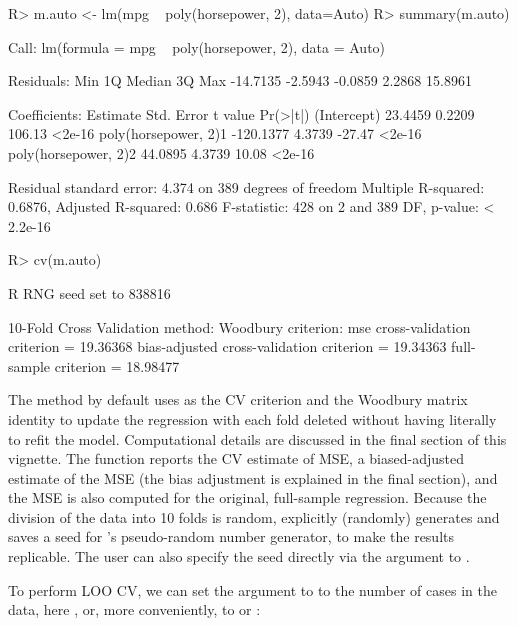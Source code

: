 \documentclass[
]{jss}
\begin{document}
\begin{CodeChunk}
\begin{CodeInput}
R> m.auto <- lm(mpg ~ poly(horsepower, 2), data=Auto)
R> summary(m.auto)
\end{CodeInput}
\begin{CodeOutput}

Call:
lm(formula = mpg ~ poly(horsepower, 2), data = Auto)

Residuals:
     Min       1Q   Median       3Q      Max 
-14.7135  -2.5943  -0.0859   2.2868  15.8961 

Coefficients:
                      Estimate Std. Error t value Pr(>|t|)
(Intercept)            23.4459     0.2209  106.13   <2e-16
poly(horsepower, 2)1 -120.1377     4.3739  -27.47   <2e-16
poly(horsepower, 2)2   44.0895     4.3739   10.08   <2e-16

Residual standard error: 4.374 on 389 degrees of freedom
Multiple R-squared:  0.6876,    Adjusted R-squared:  0.686 
F-statistic:   428 on 2 and 389 DF,  p-value: < 2.2e-16
\end{CodeOutput}
\begin{CodeInput}
R> cv(m.auto)
\end{CodeInput}
\begin{CodeOutput}
R RNG seed set to 838816
\end{CodeOutput}
\begin{CodeOutput}
10-Fold Cross Validation
method: Woodbury
criterion: mse
cross-validation criterion = 19.36368
bias-adjusted cross-validation criterion = 19.34363
full-sample criterion = 18.98477 
\end{CodeOutput}
\end{CodeChunk}

The  method by default uses  as the CV criterion
and the Woodbury matrix identity to update the regression with each fold
deleted without having literally to refit the model. Computational
details are discussed in the final section of this vignette. The
function reports the CV estimate of MSE, a biased-adjusted estimate of
the MSE (the bias adjustment is explained in the final section), and the
MSE is also computed for the original, full-sample regression. Because
the division of the data into 10 folds is random,  explicitly
(randomly) generates and saves a seed for 's pseudo-random
number generator, to make the results replicable. The user can also
specify the seed directly via the  argument to .

To perform LOO CV, we can set the  argument to  to
the number of cases in the data, here , or, more
conveniently, to  or :
\end{document}

